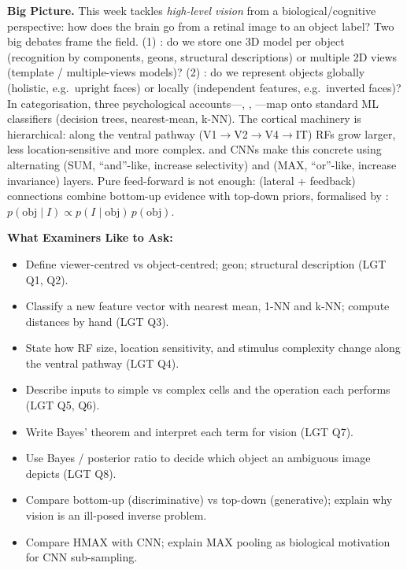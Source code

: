 \textbf{Big Picture.}
This week tackles \emph{high-level vision} from a biological/cognitive perspective: how does the brain go from a retinal image to an object label? Two big debates frame the field. (1) : do we store one 3D model per object (recognition by components, geons, structural descriptions) or multiple 2D views (template / multiple-views models)? (2) : do we represent objects globally (holistic, e.g.\ upright faces) or locally (independent features, e.g.\ inverted faces)? In categorisation, three psychological accounts---, , ---map onto standard ML classifiers (decision trees, nearest-mean, k-NN). The cortical machinery is hierarchical: along the ventral pathway (V1$\rightarrow$V2$\rightarrow$V4$\rightarrow$IT) RFs grow larger, less location-sensitive and more complex.  and CNNs make this concrete using alternating  (SUM, ``and''-like, increase selectivity) and  (MAX, ``or''-like, increase invariance) layers. Pure feed-forward is not enough:  (lateral + feedback) connections combine bottom-up evidence with top-down priors, formalised by : $p(\text{obj}\mid I) \propto p(I\mid \text{obj})\, p(\text{obj})$.

\separator

\textbf{What Examiners Like to Ask:}
\begin{itemize}
  \item Define viewer-centred vs object-centred; geon; structural description (LGT Q1, Q2).
  \item Classify a new feature vector with nearest mean, 1-NN and k-NN; compute distances by hand (LGT Q3).
  \item State how RF size, location sensitivity, and stimulus complexity change along the ventral pathway (LGT Q4).
  \item Describe inputs to simple vs complex cells and the operation each performs (LGT Q5, Q6).
  \item Write Bayes' theorem and interpret each term for vision (LGT Q7).
  \item Use Bayes / posterior ratio to decide which object an ambiguous image depicts (LGT Q8).
  \item Compare bottom-up (discriminative) vs top-down (generative); explain why vision is an ill-posed inverse problem.
  \item Compare HMAX with CNN; explain MAX pooling as biological motivation for CNN sub-sampling.
\end{itemize}

